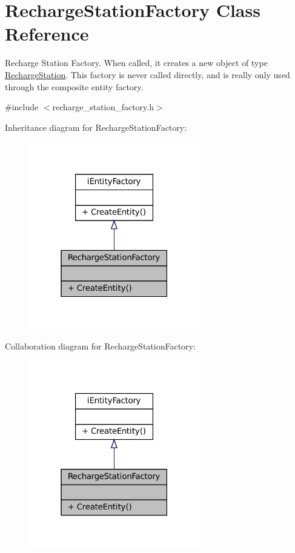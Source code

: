 \hypertarget{classRechargeStationFactory}{}\section{Recharge\+Station\+Factory Class Reference}
\label{classRechargeStationFactory}


Recharge Station Factory. When called, it creates a new object of type \hyperlink{classRechargeStation}{Recharge\+Station}. This factory is never called directly, and is really only used through the composite entity factory.  




{\ttfamily \#include $<$recharge\+\_\+station\+\_\+factory.\+h$>$}



Inheritance diagram for Recharge\+Station\+Factory\+:\nopagebreak
\begin{figure}[H]
\begin{center}
\leavevmode
\includegraphics[width=211pt]{classRechargeStationFactory__inherit__graph}
\end{center}
\end{figure}


Collaboration diagram for Recharge\+Station\+Factory\+:\nopagebreak
\begin{figure}[H]
\begin{center}
\leavevmode
\includegraphics[width=211pt]{classRechargeStationFactory__coll__graph}
\end{center}
\end{figure}
